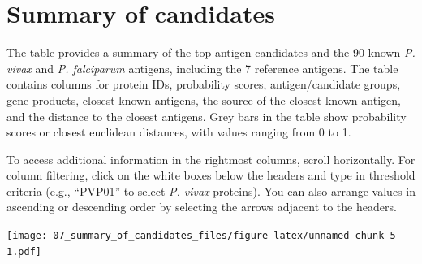 \documentclass[
  11pt,
  oneside]{book}
\begin{document}
\hypertarget{07_summary_of_candidates}{%
\chapter{Summary of candidates}\label{07_summary_of_candidates}}

The table provides a summary of the top antigen candidates and the 90 known \emph{P. vivax} and \emph{P. falciparum} antigens, including the 7 reference antigens. The table contains columns for protein IDs, probability scores, antigen/candidate groups, gene products, closest known antigens, the source of the closest known antigen, and the distance to the closest antigens. Grey bars in the table show probability scores or closest euclidean distances, with values ranging from 0 to 1.

To access additional information in the rightmost columns, scroll horizontally. For column filtering, click on the white boxes below the headers and type in threshold criteria (e.g., ``PVP01'' to select \emph{P. vivax} proteins). You can also arrange values in ascending or descending order by selecting the arrows adjacent to the headers.

\texttt{[image: 07\_summary\_of\_candidates\_files/figure-latex/unnamed-chunk-5-1.pdf]}
\end{document}
